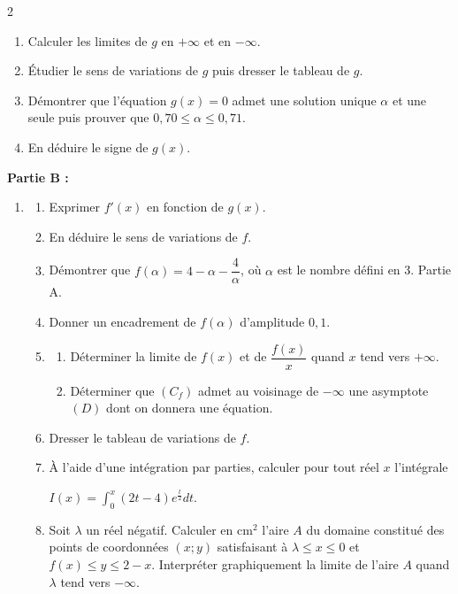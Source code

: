 \documentclass[12pt,a4paper]{article}
\begin{document}
\begin{multicols}{2}
\begin{enumerate}
\item Calculer les limites de $g$ en $+\infty$ et en $-\infty$.

\item Étudier le sens de variations de $g$ puis dresser le tableau de $g$.

\item Démontrer que l’équation \( g(x)=0 \) admet une solution unique $\alpha$ et une seule puis prouver que  
\( 0,70\leq \alpha \leq 0,71. \)

\item En déduire le signe de $g(x)$.
\end{enumerate}

\textbf{Partie B :}

\begin{enumerate}
\item 
\begin{enumerate}
\item Exprimer $f'(x)$ en fonction de $g(x)$.
\item En déduire le sens de variations de $f$.
\item Démontrer que \( f(\alpha)=4-\alpha-\dfrac{4}{\alpha} \), où $\alpha$ est le nombre défini en 3. Partie A.
\item Donner un encadrement de $f(\alpha)$ d’amplitude $0,1$.
\item 
\begin{enumerate}
\item Déterminer la limite de $f(x)$ et de \( \dfrac{f(x)}{x} \) quand $x$ tend vers $+\infty$.
\item Déterminer que $(C_f)$ admet au voisinage de $-\infty$ une asymptote $(D)$ dont on donnera une équation.
\end{enumerate}
\item Dresser le tableau de variations de $f$.
\item À l’aide d’une intégration par parties, calculer pour tout réel $x$ l’intégrale 
 
\( I(x)=\int_{0}^{x}(2t-4)e^{\frac{t}{2}}dt. \)
\item Soit $\lambda$ un réel négatif. Calculer en cm$^2$ l’aire $A$ du domaine constitué des points de coordonnées $(x;y)$ satisfaisant à  
\( \lambda\leq x\leq 0 \) et \( f(x)\leq y\leq 2-x. \)  
Interpréter graphiquement la limite de l’aire $A$ quand $\lambda$ tend vers $-\infty$.
\end{enumerate}
\end{enumerate}


\end{multicols}
\end{document}
